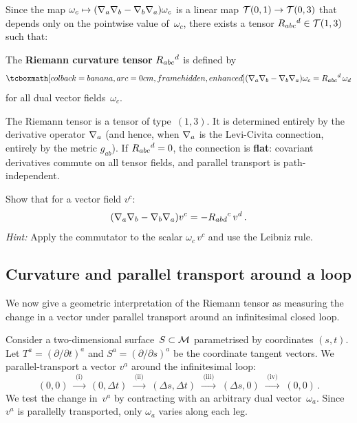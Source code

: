 Since the map
$\omega_c \mapsto (\nabla_a\nabla_b - \nabla_b\nabla_a)\omega_c$
is a linear map $\mathcal{T}(0,1)\to\mathcal{T}(0,3)$ that depends only
on the pointwise value of~$\omega_c$, there exists a tensor
$R_{abc}{}^d\in\mathcal{T}(1,3)$ such that:

\begin{definition}\label{def:riemann}
  The \textbf{Riemann curvature tensor}
  $R_{abc}{}^d$ is defined by
  \begin{equation}\label{eq:riemann-def}
    \eqbox{(\covd_a\covd_b - \covd_b\covd_a)\omega_c
      = \Riem_{abc}{}^d\,\omega_d}
  \end{equation}
  for all dual vector fields~$\omega_c$.
\end{definition}

\begin{remark}
  The Riemann tensor is a tensor of type~$(1,3)$.  It is
  determined entirely by the derivative operator $\nabla_a$ (and
  hence, when $\nabla_a$ is the Levi-Civita connection, entirely
  by the metric $g_{ab}$).  If $R_{abc}{}^d = 0$, the
  connection is \textbf{flat}: covariant derivatives commute on
  all tensor fields, and parallel transport is path-independent.
\end{remark}

\begin{exercise}\label{ex:riemann-on-vectors}
  Show that for a vector field $v^c$:
  \[
    (\nabla_a\nabla_b - \nabla_b\nabla_a)v^c
      = -R_{abd}{}^c\,v^d\,.
  \]
  \emph{Hint:} Apply the commutator to the scalar
  $\omega_c\,v^c$ and use the Leibniz rule.
\end{exercise}

\subsection{Curvature and parallel transport around a loop}%
\label{sec:curvature-loop}

We now give a geometric interpretation of the Riemann tensor as
measuring the change in a vector under parallel transport
around an infinitesimal closed loop.



Consider a two-dimensional surface~$S\subset\mathcal{M}$ parametrised by
coordinates $(s,t)$.  Let $T^a = (\partial/\partial t)^a$ and
$S^a = (\partial/\partial s)^a$ be the coordinate tangent
vectors.  We parallel-transport a vector $v^a$ around the
infinitesimal loop:
\[
  (0,0) \;\xrightarrow{\;\text{(i)}\;}\; (0,\Delta t)
  \;\xrightarrow{\;\text{(ii)}\;}\; (\Delta s,\Delta t)
  \;\xrightarrow{\;\text{(iii)}\;}\; (\Delta s,0)
  \;\xrightarrow{\;\text{(iv)}\;}\; (0,0)\,.
\]
We test the change in~$v^a$ by contracting with an arbitrary
dual vector~$\omega_a$.  Since $v^a$ is parallelly transported,
only $\omega_a$ varies along each leg.

